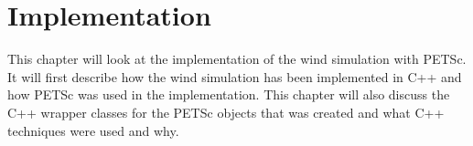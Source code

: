 \chapter{Implementation}

This chapter will look at the implementation of the wind simulation with PETSc.
It will first describe how the wind simulation has been implemented in C++ and
how PETSc was used in the implementation. This chapter will also discuss the
C++ wrapper classes for the PETSc objects that was created and what C++
techniques were used and why.




